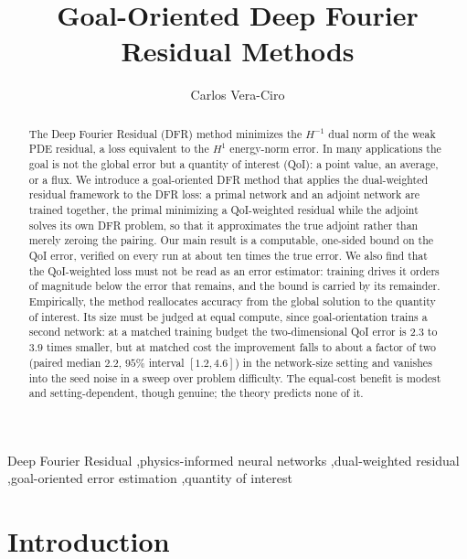 \documentclass[preprint,11pt]{elsarticle}
\begin{document}
\begin{frontmatter}

\title{Goal-Oriented Deep Fourier Residual Methods}

\author{Carlos Vera-Ciro}

\begin{abstract}
The Deep Fourier Residual (DFR) method minimizes the $H^{-1}$ dual norm of the weak PDE residual, a loss equivalent to the $H^1$ energy-norm error. In many applications the goal is not the global error but a quantity of interest (QoI): a point value, an average, or a flux. We introduce a goal-oriented DFR method that applies the dual-weighted residual framework to the DFR loss: a primal network and an adjoint network are trained together, the primal minimizing a QoI-weighted residual while the adjoint solves its own DFR problem, so that it approximates the true adjoint rather than merely zeroing the pairing. Our main result is a computable, one-sided bound on the QoI error, verified on every run at about ten times the true error. We also find that the QoI-weighted loss must not be read as an error estimator: training drives it orders of magnitude below the error that remains, and the bound is carried by its remainder. Empirically, the method reallocates accuracy from the global solution to the quantity of interest. Its size must be judged at equal compute, since goal-orientation trains a second network: at a matched training budget the two-dimensional QoI error is $2.3$ to $3.9$ times smaller, but at matched cost the improvement falls to about a factor of two (paired median $2.2$, $95\%$ interval $[1.2, 4.6]$) in the network-size setting and vanishes into the seed noise in a sweep over problem difficulty. The equal-cost benefit is modest and setting-dependent, though genuine; the theory predicts none of it.
\end{abstract}

\begin{keyword}
Deep Fourier Residual \sep physics-informed neural networks \sep dual-weighted residual \sep goal-oriented error estimation \sep quantity of interest
\end{keyword}

\end{frontmatter}

\section{Introduction}
\label{sec:introduction}
\end{document}

